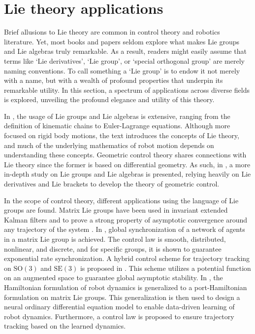 \section{Lie theory applications} \label{sec:lit-review-lie-theory}
Brief allusions to Lie theory are common in control theory and robotics literature. Yet, most books and papers seldom explore what makes Lie groups and Lie algebras truly remarkable. As a result, readers might easily assume that terms like `Lie derivatives', `Lie group', or `special orthogonal group' are merely naming conventions. To call something a `Lie group' is to endow it not merely with a name, but with a wealth of profound properties that underpin its remarkable utility. In this section, a spectrum of applications across diverse fields is explored, unveiling the profound elegance and utility of this theory.

In \citet{Murray1994}, the usage of Lie groups and Lie algebras is extensive, ranging from the definition of kinematic chains to Euler-Lagrange equations. Although more focused on rigid body motions, the text introduces the concepts of Lie theory, and much of the underlying mathematics of robot motion depends on understanding these concepts. Geometric control theory shares connections with Lie theory since the former is based on differential geometry. As such, in \citet{Bullo2004}, a more in-depth study on Lie groups and Lie algebras is presented, relying heavily on Lie derivatives and Lie brackets to develop the theory of geometric control.

In the scope of control theory, different applications using the language of Lie groups are found. Matrix Lie groups have been used in invariant extended Kalman filters and to prove a strong property of asymptotic convergence around any trajectory of the system \citep{Barrau2017}. In \citet{Mccarthy2020}, global synchronization of a network of agents in a matrix Lie group is achieved. The control law is smooth, distributed, nonlinear, and discrete, and for specific groups, it is shown to guarantee exponential rate synchronization. A hybrid control scheme for trajectory tracking on $\text{SO}(3)$ and $\text{SE}(3)$ is proposed in \citet{Wang2022}. This scheme utilizes a potential function on an augmented space to guarantee global asymptotic stability. In \citet{Duong2024}, the Hamiltonian formulation of robot dynamics is generalized to a port-Hamiltonian formulation on matrix Lie groups. This generalization is then used to design a neural ordinary differential equation model to enable data-driven learning of robot dynamics. Furthermore, a control law is proposed to ensure trajectory tracking based on the learned dynamics.


